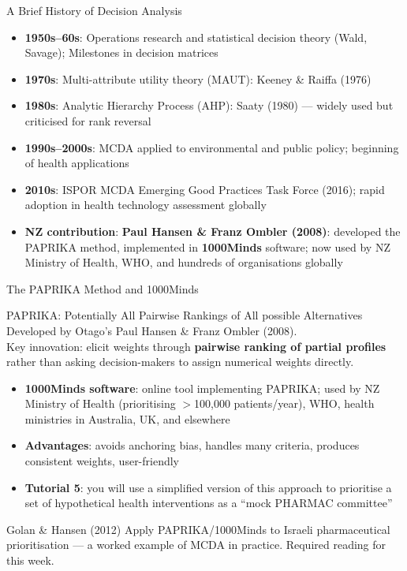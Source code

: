 \documentclass[aspectratio=169, 12pt]{beamer}
\begin{document}
\begin{frame}{A Brief History of Decision Analysis}
  \begin{itemize}
    \item \textbf{1950s--60s}: Operations research and statistical decision theory
          (Wald, Savage); Milestones in decision matrices
    \item \textbf{1970s}: Multi-attribute utility theory (MAUT): Keeney \& Raiffa (1976)
    \item \textbf{1980s}: Analytic Hierarchy Process (AHP): Saaty (1980) --- widely used
          but criticised for rank reversal
    \item \textbf{1990s--2000s}: MCDA applied to environmental and public policy;
          beginning of health applications
    \item \textbf{2010s}: ISPOR MCDA Emerging Good Practices Task Force (2016);
          rapid adoption in health technology assessment globally
    \item \textbf{NZ contribution}: \textbf{Paul Hansen \& Franz Ombler (2008)}: developed
          the PAPRIKA method, implemented in \textbf{1000Minds} software; now used by
          NZ Ministry of Health, WHO, and hundreds of organisations globally
  \end{itemize}
\end{frame}

\begin{frame}{The PAPRIKA Method and 1000Minds}
  \begin{block}{PAPRIKA: Potentially All Pairwise Rankings of All possible Alternatives}
    Developed by Otago's Paul Hansen \& Franz Ombler (2008).\\
    Key innovation: elicit weights through \textbf{pairwise ranking of partial profiles}
    rather than asking decision-makers to assign numerical weights directly.
  \end{block}
  \vspace{0.3em}
  \begin{itemize}
    \item \textbf{1000Minds software}: online tool implementing PAPRIKA;
          used by NZ Ministry of Health (prioritising $>$100,000 patients/year),
          WHO, health ministries in Australia, UK, and elsewhere
    \item \textbf{Advantages}: avoids anchoring bias, handles many criteria, produces
          consistent weights, user-friendly
    \item \textbf{Tutorial 5}: you will use a simplified version of this approach to
          prioritise a set of hypothetical health interventions as a ``mock PHARMAC committee''
  \end{itemize}
  \begin{exampleblock}{Golan \& Hansen (2012)}
    Apply PAPRIKA/1000Minds to Israeli pharmaceutical prioritisation --- a worked example
    of MCDA in practice. Required reading for this week.
  \end{exampleblock}
\end{frame}
\end{document}
